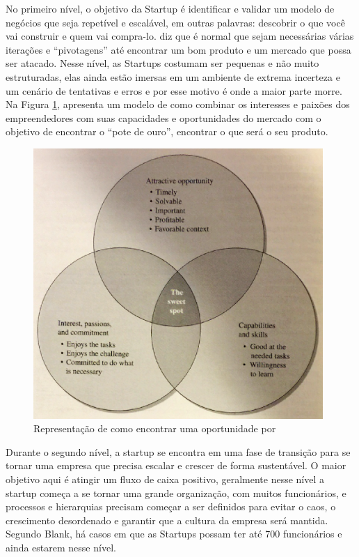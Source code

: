 No primeiro nível, o objetivo da Startup é identificar e validar um modelo de negócios que seja repetível e escalável, em outras palavras: descobrir o que você vai construir e quem vai compra-lo.  diz que é normal que sejam necessárias várias iterações e ``pivotagens'' até encontrar um bom produto e um mercado que possa ser atacado. Nesse nível, as Startups costumam ser pequenas e não muito estruturadas, elas ainda estão imersas em um ambiente de extrema incerteza e um cenário de tentativas e erros e por esse motivo é onde a maior parte morre. Na Figura \ref{figure:the_sweet_spot_byers},  apresenta um modelo de como combinar os interesses e paixões dos empreendedores com suas capacidades e oportunidades do mercado com o objetivo de encontrar o ``pote de ouro'', encontrar o que será o seu produto. 

\begin{figure}[!htb]
\centering
\includegraphics[width=11cm,angle=0]{figuras/the_sweet_spot_byers}
\caption{Representação de como encontrar uma oportunidade por \cite{Byers2014}}
\label{figure:the_sweet_spot_byers}
\end{figure}

Durante o segundo nível, a startup se encontra em uma fase de transição para se tornar uma empresa que precisa escalar e crescer de forma sustentável. O maior objetivo aqui é atingir um fluxo de caixa positivo, geralmente nesse nível a startup começa a se tornar uma grande organização, com muitos funcionários, e processos e hierarquias precisam começar a ser definidos para evitar o caos, o crescimento desordenado e garantir que a cultura da empresa será mantida. Segundo Blank, há casos em que as Startups possam ter até 700 funcionários e ainda estarem nesse nível.

